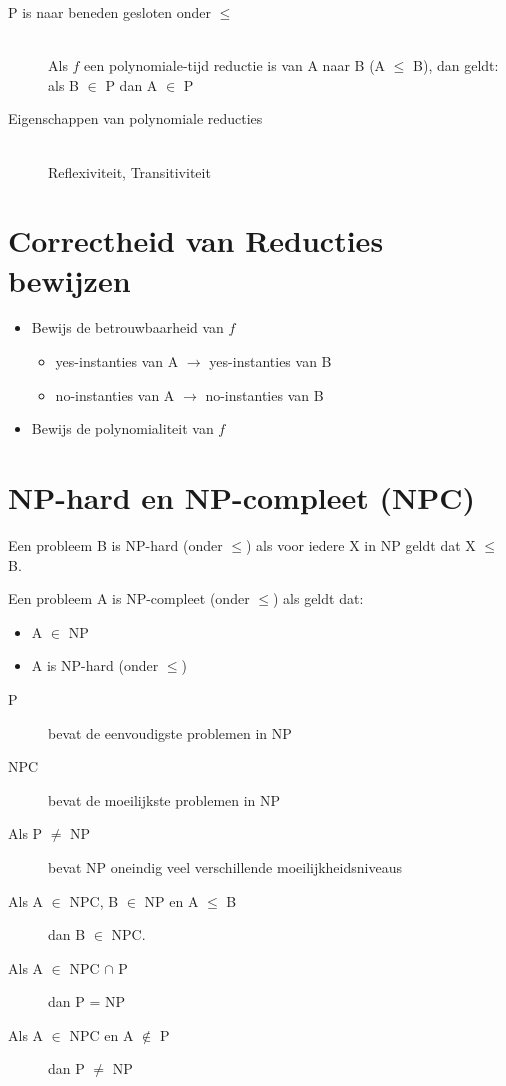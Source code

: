 \documentclass[]{article}
\begin{document}
\begin{description}
\item[P is naar beneden gesloten onder $\leq$] ~ \\
Als $f$ een polynomiale-tijd reductie is van A naar B (A $\leq$ B), dan geldt: als B $\in$ P dan A $\in$ P
\item[Eigenschappen van polynomiale reducties] ~ \\
Reflexiviteit, Transitiviteit
\end{description}

\section*{Correctheid van Reducties bewijzen}

\begin{itemize}
\item Bewijs de betrouwbaarheid van $f$
\begin{itemize}
\item yes-instanties van A $\rightarrow$ yes-instanties van B
\item no-instanties van A $\rightarrow$ no-instanties van B
\end{itemize}
\item Bewijs de polynomialiteit van $f$
\end{itemize}

\section*{NP-hard en NP-compleet (NPC)}

Een probleem B is NP-hard (onder $\leq$) als voor iedere X in NP geldt dat X $\leq$ B.

Een probleem A is NP-compleet (onder $\leq$) als geldt dat:

\begin{itemize}
\item A $\in$ NP
\item A is NP-hard (onder $\leq$)
\end{itemize}

\begin{description}
\item[P] bevat de eenvoudigste problemen in NP
\item[NPC] bevat de moeilijkste problemen in NP
\item[Als P $\not=$ NP] bevat NP oneindig veel verschillende moeilijkheidsniveaus
\item[Als A $\in$ NPC, B $\in$ NP en A $\leq$ B] dan B $\in$ NPC.
\item[Als A $\in$ NPC $\cap$ P] dan P = NP
\item[Als A $\in$ NPC en A $\not\in$ P] dan P $\not=$ NP
\end{description}
\end{document}
